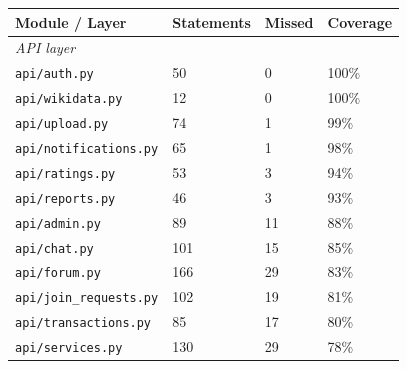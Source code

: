 \documentclass[11pt,a4paper]{report}
\begin{document}
\begin{table}[h]
    \centering
    \begin{tabularx}{\textwidth}{|l|X|X|X|}
        \hline
        \textbf{Module / Layer}                           & \textbf{Statements} & \textbf{Missed} & \textbf{Coverage} \\
        \hline
        \multicolumn{4}{|l|}{\textit{API layer}}                                                                      \\
        \hline
        \texttt{api/auth.py}                              & 50                  & 0               & 100\%             \\
        \hline
        \texttt{api/wikidata.py}                          & 12                  & 0               & 100\%             \\
        \hline
        \texttt{api/upload.py}                            & 74                  & 1               & 99\%              \\
        \hline
        \texttt{api/notifications.py}                     & 65                  & 1               & 98\%              \\
        \hline
        \texttt{api/ratings.py}                           & 53                  & 3               & 94\%              \\
        \hline
        \texttt{api/reports.py}                           & 46                  & 3               & 93\%              \\
        \hline
        \texttt{api/admin.py}                             & 89                  & 11              & 88\%              \\
        \hline
        \texttt{api/chat.py}                              & 101                 & 15              & 85\%              \\
        \hline
        \texttt{api/forum.py}                             & 166                 & 29              & 83\%              \\
        \hline
        \texttt{api/join\_requests.py}                    & 102                 & 19              & 81\%              \\
        \hline
        \texttt{api/transactions.py}                      & 85                  & 17              & 80\%              \\
        \hline
        \texttt{api/services.py}                          & 130                 & 29              & 78\%              \\

\end{tabularx}
\end{table}
\end{document}
